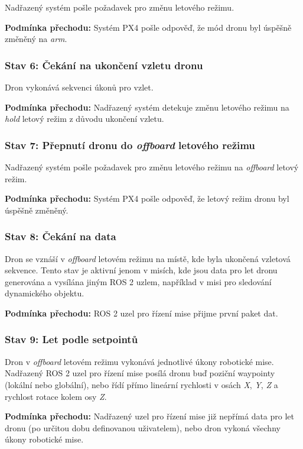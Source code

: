 Nadřazený systém pošle požadavek pro změnu letového režimu.

\noindent\textbf{Podmínka přechodu:} Systém PX4 pošle odpověď, že mód dronu byl úspěšně změněný na \textit{arm}.

\subsubsection{Stav 6: Čekání na ukončení vzletu dronu}

Dron vykonává sekvenci úkonů pro vzlet.

\noindent\textbf{Podmínka přechodu:} Nadřazený systém detekuje změnu letového režimu na \textit{hold} letový režim z důvodu ukončení vzletu.

\subsubsection{Stav 7: Přepnutí dronu do \textit{offboard} letového režimu}

Nadřazený systém pošle požadavek pro změnu letového režimu na \textit{offboard} letový režim.

\noindent\textbf{Podmínka přechodu:} Systém PX4 pošle odpověď, že letový režim dronu byl úspěšně změněný.

\subsubsection{Stav 8: Čekání na data}

Dron se vznáší v \textit{offboard} letovém režimu na místě, kde byla ukončená vzletová sekvence. Tento stav je aktivní jenom v misích, kde jsou data pro let dronu generována a vysílána jiným ROS 2 uzlem, například v misi pro sledování dynamického objektu.

\noindent\textbf{Podmínka přechodu:} ROS 2 uzel pro řízení mise přijme první paket dat.

\subsubsection{Stav 9: Let podle setpointů}

Dron v \textit{offboard} letovém režimu vykonává jednotlivé úkony robotické mise. Nadřazený ROS 2 uzel pro řízení mise posílá dronu buď poziční waypointy (lokální nebo globální), nebo řídí přímo lineární rychlosti v osách \textit{X}, \textit{Y}, \textit{Z} a rychlost rotace kolem osy \textit{Z}.

\noindent\textbf{Podmínka přechodu:} Nadřazený uzel pro řízení mise již nepřímá data pro let dronu (po určitou dobu definovanou uživatelem), nebo dron vykoná všechny úkony robotické mise.

